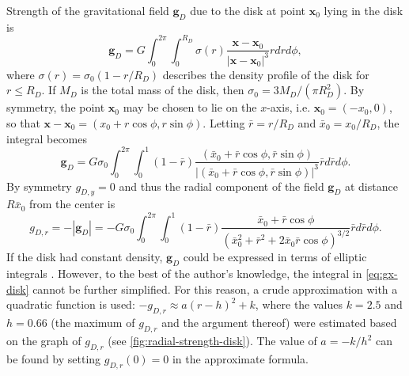 Strength of the gravitational field $\mathbf{g}_D$ due to the disk at point $\mathbf{x}_0$ lying in the disk is
\begin{equation*}
    \mathbf{g}_D = G \int_{0}^{2\pi}\int_{0}^{R_D} \sigma(r) \frac{\mathbf{x} - \mathbf{x}_0}{|\mathbf{x} - \mathbf{x}_0|^3}r dr d\phi,
\end{equation*}
where $\sigma(r) = \sigma_0(1 - r/R_D)$ describes the density profile of the disk for $r \leq R_D$.
If $M_D$ is the total mass of the disk, then $\sigma_0 = 3M_D / (\pi R_D^2)$.
By symmetry, the point $\mathbf{x}_0$ may be chosen to lie on the $x$-axis, i.e. $\mathbf{x}_0 = (-x_0, 0)$, so that $\mathbf{x} - \mathbf{x}_0 = (x_0 + r\cos\phi, r\sin\phi)$.
Letting $\bar{r} = r/R_D$ and $\bar{x}_0 = x_0 / R_D$, the integral becomes
\begin{equation*}
    \mathbf{g}_D = G\sigma_0 \int_{0}^{2\pi} \int_{0}^{1} (1 - \bar{r}) \frac{(\bar{x}_0 + \bar{r}\cos\phi, \bar{r}\sin\phi)}{|(\bar{x}_0 + \bar{r}\cos\phi, \bar{r}\sin\phi)|^3}\bar{r} d\bar{r} d\phi.
\end{equation*}
By symmetry $g_{D,y} = 0$ and thus the radial component of the field $\mathbf{g}_D$ at distance $R\bar{x}_0$ from the center is
\begin{equation}\label{eq:gx-disk}
    g_{D,r} = -|\mathbf{g}_D| = -G\sigma_0 \int_{0}^{2\pi} \int_{0}^{1} (1 - \bar{r})\frac{\bar{x}_0 + \bar{r}\cos\phi}{(\bar{x}_0^2+\bar{r}^2+2\bar{x}_0\bar{r}\cos\phi)^{3/2}}\bar{r}d\bar{r}d\phi.
\end{equation}
If the disk had constant density, $\mathbf{g}_D$ could be expressed in terms of elliptic integrals \cite{Weiss2018}.
However, to the best of the author's knowledge, the integral in \autoref{eq:gx-disk} cannot be further simplified.
For this reason, a crude approximation with a quadratic function is used: $-g_{D,r} \approx a(r - h)^2 + k$, where the values $k=2.5$ and $h=0.66$ (the maximum of $g_{D,r}$ and the argument thereof) were estimated based on the graph of $g_{D,r}$ (see \autoref{fig:radial-strength-disk}).
The value of $a = -k/h^2$ can be found by setting $g_{D,r}(0) = 0$ in the approximate formula.
